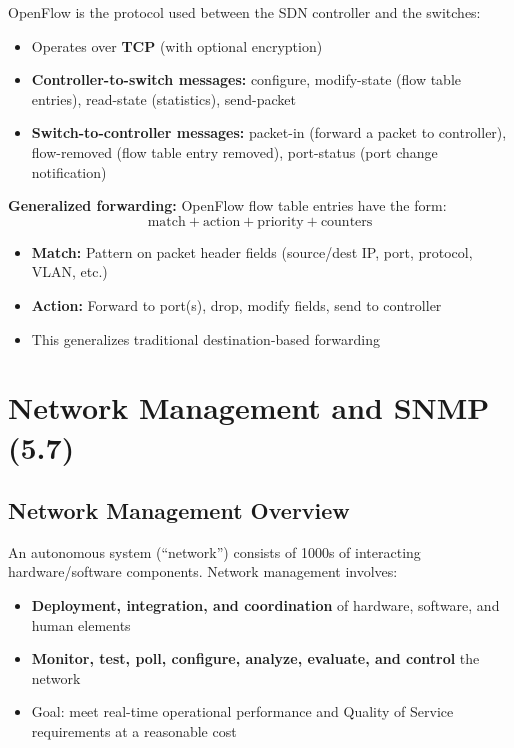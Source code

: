 \begin{keybox}
OpenFlow is the protocol used between the SDN controller and the switches:
\begin{itemize}[noitemsep]
    \item Operates over \textbf{TCP} (with optional encryption)
    \item \textbf{Controller-to-switch messages:} configure, modify-state (flow table entries), read-state (statistics), send-packet
    \item \textbf{Switch-to-controller messages:} packet-in (forward a packet to controller), flow-removed (flow table entry removed), port-status (port change notification)
\end{itemize}

\textbf{Generalized forwarding:} OpenFlow flow table entries have the form:
\[
\text{match} + \text{action} + \text{priority} + \text{counters}
\]
\begin{itemize}[noitemsep]
    \item \textbf{Match:} Pattern on packet header fields (source/dest IP, port, protocol, VLAN, etc.)
    \item \textbf{Action:} Forward to port(s), drop, modify fields, send to controller
    \item This generalizes traditional destination-based forwarding
\end{itemize}
\end{keybox}

\section{Network Management and SNMP (5.7)}

\subsection{Network Management Overview}

\begin{keybox}
An autonomous system (``network'') consists of 1000s of interacting hardware/software components. Network management involves:
\begin{itemize}[noitemsep]
    \item \textbf{Deployment, integration, and coordination} of hardware, software, and human elements
    \item \textbf{Monitor, test, poll, configure, analyze, evaluate, and control} the network
    \item Goal: meet real-time operational performance and Quality of Service requirements at a reasonable cost
\end{itemize}
\end{keybox}

